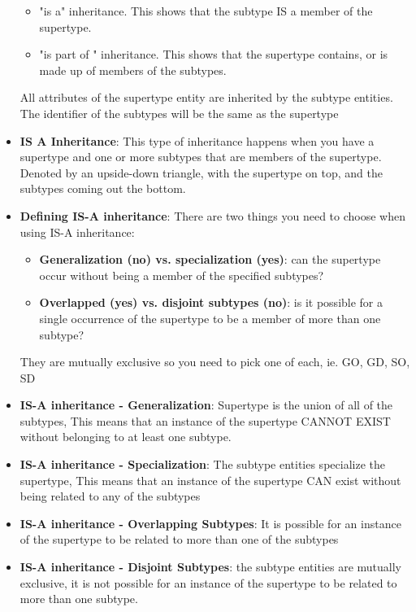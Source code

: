 \documentclass{report}
\begin{document}
\begin{itemize}
            \begin{itemize}
                \item "is a" inheritance. This shows that the subtype IS a member of the supertype.
                \item "is part of " inheritance. This shows that the supertype contains, or is made up of members of the subtypes.
            \end{itemize}
            \bigbreak \noindent 
            All attributes of the supertype entity are inherited by the subtype entities. The identifier of the subtypes will be the same as the supertype
            \bigbreak \noindent 
        \item \textbf{IS A Inheritance}:  This type of inheritance happens when you have a supertype and one or more subtypes that are members
            of the supertype. Denoted by an upside-down triangle, with the supertype on top, and the subtypes coming out the bottom.
            \bigbreak \noindent 
        \item \textbf{Defining IS-A inheritance}: There are two things you need to choose when using IS-A inheritance:
            \begin{itemize}
                \item \textbf{Generalization (no) vs. specialization (yes)}: can the supertype occur without being a member of the specified subtypes?
                \item \textbf{Overlapped (yes) vs. disjoint subtypes (no)}: is it possible for a single occurrence of the supertype to be a member of more than one subtype?
            \end{itemize}
            \bigbreak \noindent 
            They are mutually exclusive so you need to pick one of each, ie. GO, GD, SO, SD
        \item \textbf{IS-A inheritance - Generalization}:  Supertype is the union of all of the subtypes, This means that an instance of the supertype CANNOT EXIST without belonging to at least one subtype.
        \item \textbf{IS-A inheritance - Specialization}: The subtype entities specialize the supertype, This means that an instance of the supertype CAN exist without being related to any of the subtypes
        \item \textbf{IS-A inheritance - Overlapping Subtypes}: It is possible for an instance of the supertype to be related to more than one of the subtypes
        \item \textbf{IS-A inheritance - Disjoint Subtypes}: the subtype entities are mutually exclusive, it is not possible for an instance of the supertype to be related to more than one subtype.

\end{itemize}
\end{document}
